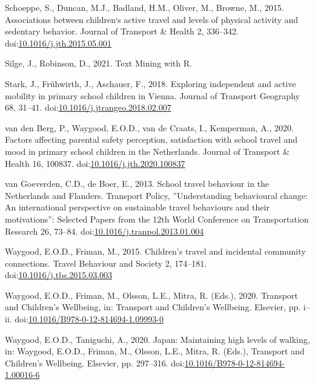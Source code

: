 \documentclass[]{elsarticle} %
\begin{document}
\leavevmode\hypertarget{ref-schoeppeAssociationsChildrenActive2015}{}%
Schoeppe, S., Duncan, M.J., Badland, H.M., Oliver, M., Browne, M., 2015.
Associations between children׳s active travel and levels of physical
activity and sedentary behavior. Journal of Transport \& Health 2,
336--342.
doi:\href{https://doi.org/10.1016/j.jth.2015.05.001}{10.1016/j.jth.2015.05.001}

\leavevmode\hypertarget{ref-silgeTextMining2021}{}%
Silge, J., Robinson, D., 2021. Text Mining with R.

\leavevmode\hypertarget{ref-starkExploringIndependentActive2018}{}%
Stark, J., Frühwirth, J., Aschauer, F., 2018. Exploring independent and
active mobility in primary school children in Vienna. Journal of
Transport Geography 68, 31--41.
doi:\href{https://doi.org/10.1016/j.jtrangeo.2018.02.007}{10.1016/j.jtrangeo.2018.02.007}

\leavevmode\hypertarget{ref-vandenbergFactorsAffectingParental2020}{}%
van den Berg, P., Waygood, E.O.D., van de Craats, I., Kemperman, A.,
2020. Factors affecting parental safety perception, satisfaction with
school travel and mood in primary school children in the Netherlands.
Journal of Transport \& Health 16, 100837.
doi:\href{https://doi.org/10.1016/j.jth.2020.100837}{10.1016/j.jth.2020.100837}

\leavevmode\hypertarget{ref-vangoeverdenSchoolTravelBehaviour2013}{}%
van Goeverden, C.D., de Boer, E., 2013. School travel behaviour in the
Netherlands and Flanders. Transport Policy, ''Understanding behavioural
change: An international perspective on sustainable travel behaviours
and their motivations'': Selected Papers from the 12th World Conference
on Transportation Research 26, 73--84.
doi:\href{https://doi.org/10.1016/j.tranpol.2013.01.004}{10.1016/j.tranpol.2013.01.004}

\leavevmode\hypertarget{ref-waygoodChildrenTravelIncidental2015}{}%
Waygood, E.O.D., Friman, M., 2015. Children's travel and incidental
community connections. Travel Behaviour and Society 2, 174--181.
doi:\href{https://doi.org/10.1016/j.tbs.2015.03.003}{10.1016/j.tbs.2015.03.003}

\leavevmode\hypertarget{ref-waygoodTransportChildrenWellbeing2020}{}%
Waygood, E.O.D., Friman, M., Olsson, L.E., Mitra, R. (Eds.), 2020.
Transport and Children's Wellbeing, in: Transport and Children's
Wellbeing. Elsevier, pp. i--ii.
doi:\href{https://doi.org/10.1016/B978-0-12-814694-1.09993-0}{10.1016/B978-0-12-814694-1.09993-0}

\leavevmode\hypertarget{ref-waygoodJapanMaintainingHigh2020}{}%
Waygood, E.O.D., Taniguchi, A., 2020. Japan: Maintaining high levels of
walking, in: Waygood, E.O.D., Friman, M., Olsson, L.E., Mitra, R.
(Eds.), Transport and Children's Wellbeing. Elsevier, pp. 297--316.
doi:\href{https://doi.org/10.1016/B978-0-12-814694-1.00016-6}{10.1016/B978-0-12-814694-1.00016-6}
\end{document}
